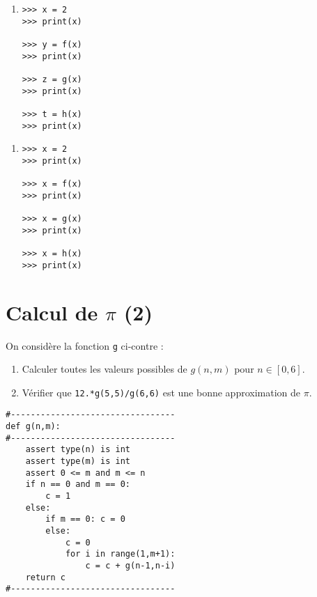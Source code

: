 \documentclass[11pt,a4paper]{article}
\begin{document}
\begin{minipage}{7cm}
\begin{enumerate}
\item 

\begin{py}{3cm}
\begin{verbatim}
>>> x = 2
>>> print(x)

>>> y = f(x)
>>> print(x)

>>> z = g(x)
>>> print(x)

>>> t = h(x)
>>> print(x)
\end{verbatim}
\end{py}

\framebox[5.5cm]{$\rule{0cm}{11cm}$}
\end{enumerate}
\end{minipage}
\hfill
\begin{minipage}{7cm}
\begin{enumerate}

\item

\begin{py}{4cm}
\begin{verbatim}
>>> x = 2
>>> print(x)

>>> x = f(x)
>>> print(x)

>>> x = g(x)
>>> print(x)

>>> x = h(x)
>>> print(x)
\end{verbatim}
\end{py}

\framebox[5.5cm]{$\rule{0cm}{11cm}$}

\end{enumerate}
\end{minipage}

\section{Calcul de $\pi$ (2)}
\begin{minipage}[t]{7cm}
On consid\`ere la fonction {\tt g} ci-contre :
\begin{enumerate}
\item Calculer toutes les valeurs possibles
	de $g(n,m)$ pour $n \in [0,6]$.
\item Vérifier que {\tt 12.*g(5,5)/g(6,6)} est une bonne approximation de
	$\pi$.
\end{enumerate}
\end{minipage}
\hfill
\begin{minipage}[t]{7cm}\footnotesize
\begin{verbatim}
#---------------------------------
def g(n,m):
#---------------------------------
    assert type(n) is int
    assert type(m) is int
    assert 0 <= m and m <= n
    if n == 0 and m == 0:
        c = 1
    else:
        if m == 0: c = 0
        else:
            c = 0
            for i in range(1,m+1):
                c = c + g(n-1,n-i)
    return c
#---------------------------------
\end{verbatim}
\end{minipage}
\end{document}
